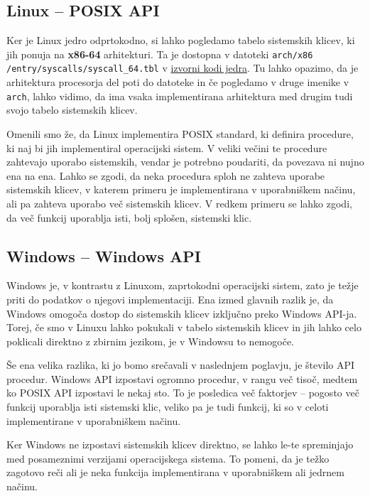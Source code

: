 \documentclass[a4paper,12pt,openright]{book}
\begin{document}
\subsection{Linux -- POSIX API}

Ker je Linux jedro odprtokodno, si lahko pogledamo tabelo sistemskih klicev, ki jih ponuja na \textbf{x86-64} arhitekturi.
Ta je dostopna v datoteki \texttt{arch/x86} \texttt{/entry/syscalls/syscall\_64.tbl} v \href{https://github.com/torvalds/linux}{izvorni kodi jedra}.
Tu lahko opazimo, da je arhitektura procesorja del poti do datoteke in če pogledamo v druge imenike v \texttt{arch}, lahko vidimo, da ima vsaka implementirana arhitektura med drugim tudi svojo tabelo sistemskih klicev.

Omenili smo že, da Linux implementira POSIX standard, ki definira procedure, ki naj bi jih implementiral operacijski sistem.
V veliki večini te procedure zahtevajo uporabo sistemskih, vendar je potrebno poudariti, da povezava ni nujno ena na ena.
Lahko se zgodi, da neka procedura sploh ne zahteva uporabe sistemskih klicev, v katerem primeru je implementirana v uporabniškem načinu, ali pa zahteva uporabo več sistemskih klicev.
V redkem primeru se lahko zgodi, da več funkcij uporablja isti, bolj splošen, sistemski klic.

\subsection{Windows -- Windows API}

Windows je, v kontrastu z Linuxom, zaprtokodni operacijski sistem, zato je težje priti do podatkov o njegovi implementaciji.
Ena izmed glavnih razlik je, da Windows omogoča dostop do sistemskih klicev izključno preko Windows API-ja.
Torej, če smo v Linuxu lahko pokukali v tabelo sistemskih klicev in jih lahko celo poklicali direktno z zbirnim jezikom, je v Windowsu to nemogoče.

Še ena velika razlika, ki jo bomo srečavali v naslednjem poglavju, je število API procedur.
Windows API izpostavi ogromno procedur, v rangu več tisoč, medtem ko POSIX API izpostavi le nekaj sto.
To je posledica več faktorjev -- pogosto več funkcij uporablja isti sistemski klic, veliko pa je tudi funkcij, ki so v celoti implementirane v uporabniškem načinu.

Ker Windows ne izpostavi sistemskih klicev direktno, se lahko le-te spreminjajo med posameznimi verzijami operacijskega sistema.
To pomeni, da je težko zagotovo reči ali je neka funkcija implementirana v uporabniškem ali jedrnem načinu.
\cite{Tanenbaum_Bos_2023}
\end{document}
